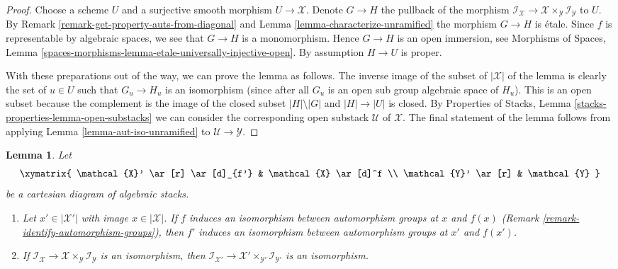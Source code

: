 \documentclass{stacks-project}
\theoremstyle{plain}
\newtheorem{lemma}[subsection]{Lemma}
\theoremstyle{definition}
\theoremstyle{remark}
\numberwithin{equation}{subsection}
\begin{document}
\begin{proof}
Choose a scheme $U$ and a surjective smooth morphism $U \to \mathcal{X}$.
Denote $G \to H$ the pullback of the morphism
$\mathcal{I}_\mathcal{X} \to
\mathcal{X} \times_\mathcal{Y} \mathcal{I}_\mathcal{Y}$
to $U$. By Remark \ref{remark-get-property-auts-from-diagonal} and
Lemma \ref{lemma-characterize-unramified} the morphism
$G \to H$ is \'etale. Since $f$ is representable by algebraic spaces,
we see that $G \to H$ is a monomorphism. Hence $G \to H$ is an open
immersion, see
Morphisms of Spaces, Lemma
\ref{spaces-morphisms-lemma-etale-universally-injective-open}.
By assumption $H \to U$ is proper.

\medskip\noindent
With these preparations out of the way, we can prove the lemma as follows.
The inverse image of the subset of $|\mathcal{X}|$ of the lemma is
clearly the set of $u \in U$ such that $G_u \to H_u$ is an isomorphism
(since after all $G_u$ is an open sub group algebraic space of $H_u$).
This is an open subset because the complement is
the image of the closed subset $|H| \setminus |G|$ and $|H| \to |U|$
is closed. By
Properties of Stacks, Lemma \ref{stacks-properties-lemma-open-substacks}
we can consider the corresponding open substack $\mathcal{U}$ of $\mathcal{X}$.
The final statement of the lemma follows from
applying Lemma \ref{lemma-aut-iso-unramified}
to $\mathcal{U} \to \mathcal{Y}$.
\end{proof}

\begin{lemma}
\label{lemma-base-change-stabilizer-preserving}
Let
$$
\xymatrix{
\mathcal{X}' \ar[r] \ar[d]_{f'} & \mathcal{X} \ar[d]^f \\
\mathcal{Y}' \ar[r] & \mathcal{Y}
}
$$
be a cartesian diagram of algebraic stacks.
\begin{enumerate}
\item Let $x' \in |\mathcal{X}'|$ with image $x \in |\mathcal{X}|$.
If $f$ induces an isomorphism between automorphism groups at
$x$ and $f(x)$ (Remark \ref{remark-identify-automorphism-groups}), then
$f'$ induces an isomorphism between automorphism groups at $x'$ and $f(x')$.
\item If $\mathcal{I}_\mathcal{X} \to
\mathcal{X} \times_\mathcal{Y} \mathcal{I}_\mathcal{Y}$ is an isomorphism,
then $\mathcal{I}_{\mathcal{X}'} \to
\mathcal{X}' \times_{\mathcal{Y}'} \mathcal{I}_{\mathcal{Y}'}$
is an isomorphism.
\end{enumerate}
\end{lemma}
\end{document}
